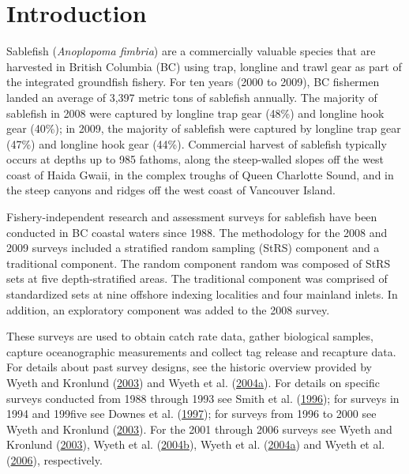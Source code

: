 \documentclass[12pt]{article}\usepackage[]{graphicx}\usepackage[]{color}
\begin{document}

\frontmatter


\renewcommand{\headrulewidth}{0.5pt}  %
\renewcommand{\footrulewidth}{0.5pt}  %

\clearpage

\hypertarget{introduction}{%
\section{Introduction}\label{introduction}}

Sablefish (\emph{Anoplopoma fimbria}) are a commercially valuable species that are harvested in British Columbia (BC) using trap, longline and trawl gear as part of the integrated groundfish fishery. For ten years (2000 to 2009), BC fishermen landed an average of 3,397 metric tons of sablefish annually. The majority of sablefish in 2008 were captured by longline trap gear (48\%) and longline hook gear (40\%); in 2009, the majority of sablefish were captured by longline trap gear (47\%) and longline hook gear (44\%). Commercial harvest of sablefish typically occurs at depths up to 985 fathoms, along the steep-walled slopes off the west coast of Haida Gwaii, in the complex troughs of Queen Charlotte Sound, and in the steep canyons and ridges off the west coast of Vancouver Island.

Fishery-independent research and assessment surveys for sablefish have been conducted in BC coastal waters since 1988. The methodology for the 2008 and 2009 surveys included a stratified random sampling (StRS) component and a traditional component. The random component random was composed of StRS sets at five depth-stratified areas. The traditional component was comprised of standardized sets at nine offshore indexing localities and four mainland inlets. In addition, an exploratory component was added to the 2008 survey.

These surveys are used to obtain catch rate data, gather biological samples, capture oceanographic measurements and collect tag release and recapture data. For details about past survey designs, see the historic overview provided by Wyeth and Kronlund (\protect\hyperlink{ref-Wyeth2003}{2003}) and Wyeth et al. (\protect\hyperlink{ref-Wyeth2004b}{2004}\protect\hyperlink{ref-Wyeth2004b}{a}). For details on specific surveys conducted from 1988 through 1993 see Smith et al. (\protect\hyperlink{ref-Smith1996}{1996}); for surveys in 1994 and 199five see Downes et al. (\protect\hyperlink{ref-Downes1997}{1997}); for surveys from 1996 to 2000 see Wyeth and Kronlund (\protect\hyperlink{ref-Wyeth2003}{2003}). For the 2001 through 2006 surveys see Wyeth and Kronlund (\protect\hyperlink{ref-Wyeth2003}{2003}), Wyeth et al. (\protect\hyperlink{ref-Wyeth2004a}{2004}\protect\hyperlink{ref-Wyeth2004a}{b}), Wyeth et al. (\protect\hyperlink{ref-Wyeth2004b}{2004}\protect\hyperlink{ref-Wyeth2004b}{a}) and Wyeth et al. (\protect\hyperlink{ref-Wyeth2006}{2006}), respectively.
\end{document}
